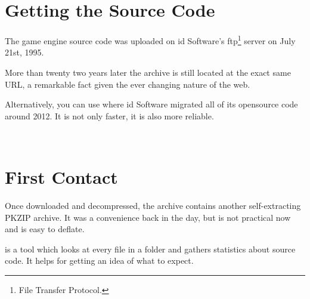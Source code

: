 \documentclass[book.tex]{subfiles}
\begin{document}
\section{Getting the Source Code}
The game engine source code was uploaded on id Software's ftp\footnote{File Transfer Protocol.} server on July 21st, 1995.\\ 
\par
\begin{minipage}{\textwidth}

\end{minipage}
\par
More than twenty two years later the archive is still located at the exact same URL, a remarkable fact given the ever changing nature of the web.\\
\par
Alternatively, you can use  where id Software migrated all of its opensource code around 2012. It is not only faster, it is also more reliable.\\
\par
{}\\
\par
\section{First Contact}
Once downloaded and decompressed, the archive  contains another self-extracting PKZIP archive. It was a convenience back in the day, but is not practical now and is easy to deflate.\\
\par
\begin{minipage}{\textwidth}

\end{minipage}

\par
{} is a tool which looks at every file in a folder and gathers statistics about source code. It helps for getting an idea of what to expect.\\
\par

\begin{minipage}{\textwidth}

\end{minipage}
\end{document}
